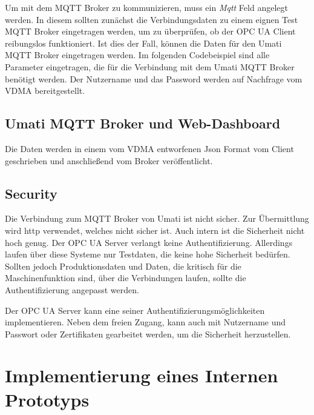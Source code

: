 \documentclass[a4paper, 12pt, oneside, toc=listofnumbered, bibliography=totoc]{scrbook}
\begin{document}
		
		
		Um mit dem MQTT Broker zu kommunizieren, muss ein \textit{Mqtt} Feld angelegt werden. In diesem sollten zunächst die Verbindungsdaten zu einem eignen Test MQTT Broker eingetragen werden, um zu überprüfen, ob der OPC UA Client reibungslos funktioniert. Ist dies der Fall, können die Daten für den Umati MQTT Broker eingetragen werden. Im folgenden Codebeispiel sind alle Parameter eingetragen, die für die Verbindung mit dem Umati MQTT Broker benötigt werden. Der Nutzername und das Password werden auf Nachfrage vom VDMA bereitgestellt.
		
		
		
		\subsection{Umati MQTT Broker und Web-Dashboard}
		
		Die Daten werden in einem vom VDMA entworfenen Json Format vom Client geschrieben und anschließend vom Broker veröffentlicht. 
		
	
		\subsection{Security}
		
		Die Verbindung zum MQTT Broker von Umati ist nicht sicher. Zur Übermittlung wird http verwendet, welches nicht sicher ist. Auch intern ist die Sicherheit nicht hoch genug. Der OPC UA Server verlangt keine Authentifizierung. Allerdings laufen über diese Systeme nur Testdaten, die keine hohe Sicherheit bedürfen. Sollten jedoch Produktionsdaten und Daten, die kritisch für die Maschinenfunktion sind, über die Verbindungen laufen, sollte die Authentifizierung angepasst werden. 
		
		Der OPC UA Server kann eine seiner Authentifizierungsmöglichkeiten implementieren. Neben dem freien Zugang, kann auch mit Nutzername und Passwort oder Zertifikaten gearbeitet werden, um die Sicherheit herzustellen. 
	
	\section{Implementierung eines Internen Prototyps}\label{ch:Implementierung-Intern}
	
\end{document}
